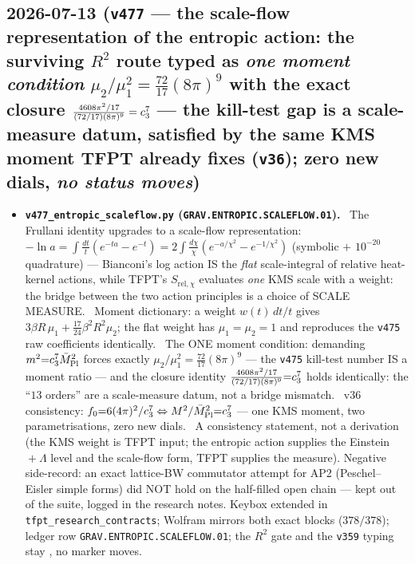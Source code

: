 \subsection*{2026-07-13 (\texttt{v477} --- the scale-flow representation of the entropic action: the surviving $R^2$ route typed as \emph{one moment condition} $\mu_2/\mu_1^2=\tfrac{72}{17}(8\pi)^9$ with the exact closure $\tfrac{4608\pi^2/17}{(72/17)(8\pi)^9}=c_3^7$ --- the kill-test gap is a scale-measure datum, satisfied by the same KMS moment TFPT already fixes (\texttt{v36}); zero new dials, \emph{no status moves})}
\begin{itemize}[leftmargin=1.5em]
\item \textbf{\texttt{v477\_entropic\_scaleflow.py} (\texttt{GRAV.ENTROPIC.SCALEFLOW.01}).} \mE\ The
Frullani identity upgrades to a scale-flow representation: $-\ln a=\int\tfrac{dt}t(e^{-ta}{-}e^{-t})
=2\int\tfrac{d\chi}\chi(e^{-a/\chi^2}{-}e^{-1/\chi^2})$ (symbolic $+$ $10^{-20}$ quadrature) ---
Bianconi's log action IS the \emph{flat} scale-integral of relative heat-kernel actions, while TFPT's
$S_{\mathrm{rel},\chi}$ evaluates \emph{one} KMS scale with a weight: the bridge between the two action
principles is a choice of SCALE MEASURE. \mE\ Moment dictionary: a weight $w(t)\,dt/t$ gives
$3\beta R\,\mu_1+\tfrac{17}{24}\beta^2R^2\mu_2$; the flat weight has $\mu_1{=}\mu_2{=}1$ and reproduces
the \texttt{v475} raw coefficients identically. \mE\ The ONE moment condition: demanding
$m^2{=}c_3^7\bar M_{\mathrm{Pl}}^2$ forces exactly $\mu_2/\mu_1^2{=}\tfrac{72}{17}(8\pi)^9$ --- the \texttt{v475}
kill-test number IS a moment ratio --- and the closure identity $\tfrac{4608\pi^2/17}{(72/17)(8\pi)^9}
{=}c_3^7$ holds identically: the ``$13$ orders'' are a scale-measure datum, not a bridge mismatch.
\mE\ v36 consistency: $f_0{=}6(4\pi)^2/c_3^7\Leftrightarrow M^2/\bar M_{\mathrm{Pl}}^2{=}c_3^7$ --- one KMS
moment, two parametrisations, zero new dials. \mC\ A consistency statement, not a derivation (the KMS
weight is TFPT input; the entropic action supplies the Einstein${}+\Lambda$ level and the scale-flow
form, TFPT supplies the measure). Negative side-record: an exact lattice-BW commutator attempt for AP2
(Peschel--Eisler simple forms) did NOT hold on the half-filled open chain --- kept out of the suite,
logged in the research notes. Keybox extended in \texttt{tfpt\_research\_contracts}; Wolfram mirrors
both exact blocks ($378/378$); ledger row \texttt{GRAV.ENTROPIC.SCALEFLOW.01}; the $R^2$ gate and the
\texttt{v359} typing stay \mO, no marker moves.
\end{itemize}

